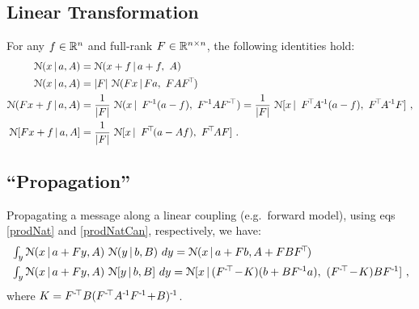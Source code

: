 \subsection{Linear Transformation}

For any $f\in{\mathbb{R}}^n$ and full-rank $F\in{\mathbb{R}}^{n\times n}$, the
following identities hold:
\begin{align}
\NN(x\|a,A) &= \NN(x+f\|a+f,~A) \\
\NN(x\|a,A) &= |F|~ \NN(Fx \| Fa,~FAF^\T) \\
\NN(F x + f \| a,A)
&= \frac{1}{|F|}~ \NN(x \| ~ F^\1 (a-f),~ F^\1 AF^\mT)
 = \frac{1}{|F|}~ \NN[x \| ~ F^\T A^\1 (a-f),~ F^\T A^\1 F] ~, \\
\NN[F x + f \| a,A]
&= \frac{1}{|F|}~ \NN[x \| ~ F^\T(a-Af),~ F^\T A F] ~.
\end{align}

\subsection{``Propagation''}

Propagating a message along a linear coupling (e.g.\ forward model), using
 eqs \eqref{prodNat} and \eqref{prodNatCan}, respectively, we have:
\begin{align}
& \textstyle\int_y \NN(x \| a + Fy, A)~ \NN(y \| b, B)~ dy
 = \NN(x \| a + Fb, A+FBF^\T) \\
& \textstyle\int_y \NN(x \| a + Fy, A)~ \NN[y \| b, B]~ dy
 = \NN[x \| (F^\mT\-K)(b+BF^\1a),~ (F^\mT\-K)BF^\1] ~,
\end{align}
where $K=F^{\text{-}\!\top} B(F^{\text{-}\!\top} A^{{\hspace*{-.0pt}\text{\rm -}\hspace*{-.5pt}}1} F^{{\hspace*{-.0pt}\text{\rm -}\hspace*{-.5pt}}1}\!+\!B)^{{\hspace*{-.0pt}\text{\rm -}\hspace*{-.5pt}}1}$.


